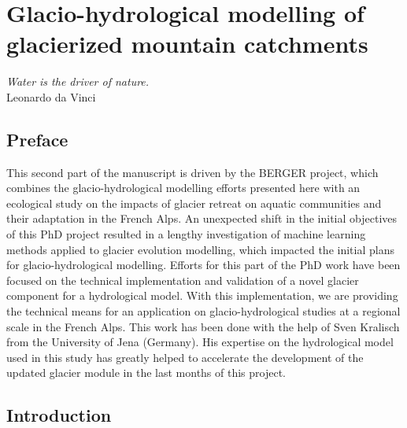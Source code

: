 \chapter{Glacio-hydrological modelling of glacierized mountain catchments}
\label{chap:discussion}

\begin{flushright}
\begin{small}
\textit{Water is the driver of nature.}\\
Leonardo da Vinci
\end{small}
\end{flushright}

\section*{Preface}

This second part of the manuscript is driven by the BERGER project, which combines the glacio-hydrological modelling efforts presented here with an ecological study on the impacts of glacier retreat on aquatic communities and their adaptation in the French Alps. An unexpected shift in the initial objectives of this PhD project resulted in a lengthy investigation of machine learning methods applied to glacier evolution modelling, which impacted the initial plans for glacio-hydrological modelling. Efforts for this part of the PhD work have been focused on the technical implementation and validation of a novel glacier component for a hydrological model. With this implementation, we are providing the technical means for an application on glacio-hydrological studies at a regional scale in the French Alps. This work has been done with the help of Sven Kralisch from the University of Jena (Germany). His expertise on the hydrological model used in this study has greatly helped to accelerate the development of the updated glacier module in the last months of this project.

\section{Introduction}

